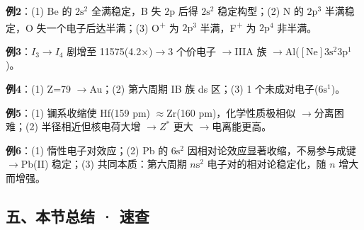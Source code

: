 \documentclass[a4paper,11pt]{ctexart}
\newcommand{\箭}{\ensuremath{\rightarrow}}
\newcommand{\左箭}{\ensuremath{\leftarrow}}
\newcommand{\上箭}{\ensuremath{\uparrow}}
\newcommand{\下箭}{\ensuremath{\downarrow}}
\newcommand{\衡}{\ensuremath{\rightleftharpoons}}
\newcommand{\双箭}{\ensuremath{\leftrightarrow}}
\newcommand{\约等于}{\ensuremath{\approx}}
\newcommand{\小于等于}{\ensuremath{\leq}}
\newcommand{\大于等于}{\ensuremath{\geq}}
\newcommand{\不等于}{\ensuremath{\neq}}
\newcommand{\西格马}{\ensuremath{\sigma}}
\newcommand{\派}{\ensuremath{\pi}}
\begin{document}
\textbf{例2}：(1) Be 的 \(2\mathrm{s}^2\) 全满稳定，B 失 \(2\mathrm{p}\) 后得 \(2\mathrm{s}^2\) 稳定构型；(2) N 的 \(2\mathrm{p}^3\) 半满稳定，O 失一个电子后达半满；(3) O\textsuperscript{+} 为 \(2\mathrm{p}^3\) 半满，F\textsuperscript{+} 为 \(2\mathrm{p}^4\) 非半满。

\textbf{例3}：\(I_3 \to I_4\) 剧增至 11575(4.2×)\箭 3 个价电子 \箭 IIIA 族 \箭 Al(\([\mathrm{Ne}]3\mathrm{s}^2 3\mathrm{p}^1\))。

\textbf{例4}：(1) Z=79 \箭 Au；(2) 第六周期 IB 族 ds 区；(3) 1 个未成对电子(\(6\mathrm{s}^1\))。

\textbf{例5}：(1) 镧系收缩使 Hf(159 pm) \约等于 Zr(160 pm)，化学性质极相似 \箭 分离困难；(2) 半径相近但核电荷大增 \箭 \(Z^*\) 更大 \箭 电离能更高。

\textbf{例6}：(1) 惰性电子对效应；(2) Pb 的 \(6\mathrm{s}^2\) 因相对论效应显著收缩，不易参与成键 \箭 Pb(II) 稳定；(3) 共同本质：第六周期 \(n\mathrm{s}^2\) 电子对的相对论稳定化，随 \(n\) 增大而增强。

\subsection{五、本节总结 · 速查}\label{ux4e94ux672cux8282ux603bux7ed3-ux901fux67e5}
\end{document}
